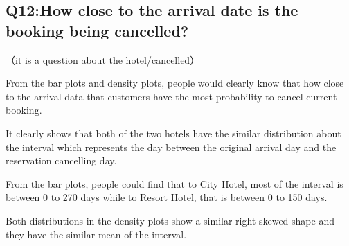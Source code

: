 \documentclass[11pt,a4paper,]{article}
\newenvironment{Shaded}{\begin{snugshade}}{\end{snugshade}}
\newcommand{\DataTypeTok}[1]{\textcolor[rgb]{0.13,0.29,0.53}{#1}}
\newcommand{\DecValTok}[1]{\textcolor[rgb]{0.00,0.00,0.81}{#1}}
\newcommand{\KeywordTok}[1]{\textcolor[rgb]{0.13,0.29,0.53}{\textbf{#1}}}
\newcommand{\NormalTok}[1]{#1}
\newcommand{\OperatorTok}[1]{\textcolor[rgb]{0.81,0.36,0.00}{\textbf{#1}}}
\newcommand{\StringTok}[1]{\textcolor[rgb]{0.31,0.60,0.02}{#1}}
\begin{document}
\hypertarget{q12how-close-to-the-arrival-date-is-the-booking-being-cancelled}{%
\subsection{Q12:How close to the arrival date is the booking being cancelled?}\label{q12how-close-to-the-arrival-date-is-the-booking-being-cancelled}}

（it is a question about the hotel/cancelled）

From the bar plots and density plots, people would clearly know that how close to the arrival data that customers have the most probability to cancel current booking.

It clearly shows that both of the two hotels have the similar distribution about the interval which represents the day between the original arrival day and the reservation cancelling day.

From the bar plots, people could find that to City Hotel, most of the interval is between 0 to 270 days while to Resort Hotel, that is between 0 to 150 days.

Both distributions in the density plots show a similar right skewed shape and they have the similar mean of the interval.

\begin{Shaded}
\end{Shaded}
\end{document}
